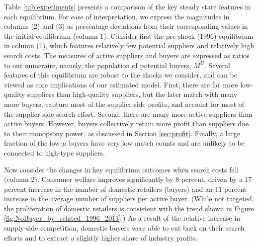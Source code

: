 \documentclass[12pt]{article} \usepackage{amsmath,amssymb,amsthm,geometry,graphicx,setspace,algorithm,algpseudocode,float}
\begin{document}
Table \ref{tab:experiments} presents a comparison of the key steady state features in each equilibrium. For ease of interpretation, we express the magnitudes in columns (2) and (3) as percentage deviations from their corresponding values in the initial equilibrium (column 1). Consider first the pre-shock (1996) equilibrium in column (1), which features relatively few potential suppliers and relatively high search costs. The measures of active suppliers and buyers are expressed as ratios to our numeraire, namely, the population of potential buyers, $M^{B}$.  Several features of this equilibrium are robust to the shocks we consider, and can be viewed as core implications of our estimated model. First, there are far more low-quality suppliers than high-quality suppliers, but the later match with many more buyers, capture most of the supplier-side profits, and account for most of the supplier-side search effort. Second, there are many more active suppliers than active buyers. However, buyers collectively retain more profit than suppliers due to their monopsony power, as discussed in Section \ref{sec:profit}. Finally, a large fraction of the low-$\mu$ buyers have very low match counts and are unlikely to be connected to high-type suppliers.
\par
Now consider the changes in key equilibrium outcomes when search costs fall (column 2).  Consumer welfare improves significantly by $8$ percent, driven by a 17 percent increase in the number of domestic retailers (buyers) and an $11$ percent increase in the average number of suppliers per active buyer. (While not targeted, the proliferation of domestic retailers is consistent with the trend shown in Figure \ref{fig:NoBuyer_by_related_1996_2011}.) As a result of the relative increase in supply-side competition, domestic buyers were able to cut back on their search efforts and to extract a slightly higher share of industry profits.
\par
\medskip

\end{document}

